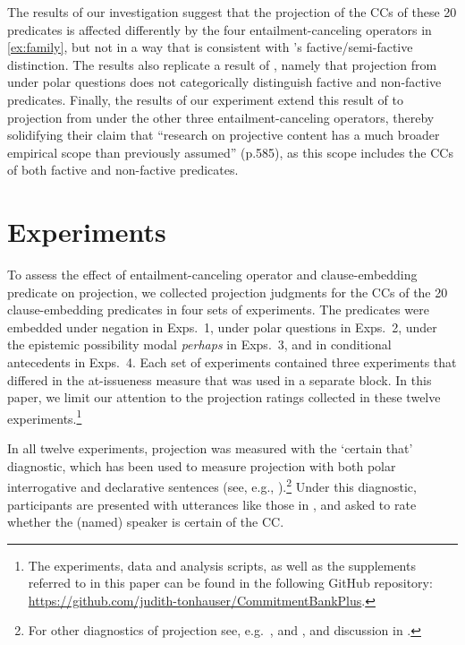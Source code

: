 \documentclass[a4paper,12pt,twoside]{article}
\newcommand{\poscite}[1]{\citeauthor{#1}'s \citeyear{#1}}
\begin{document}
    The results of our investigation suggest that the projection of the CCs of these 20 predicates is affected differently by the four entailment-canceling operators in \ref{ex:family},  but not in a way that is consistent with \poscite{karttunen_observations_1971} factive/semi-factive distinction. The results also replicate a result of \citealt{degen_are_2022}, namely that projection from under polar questions does not categorically distinguish factive and non-factive predicates. Finally, the results of our experiment extend this result of \citealt{degen_are_2022} to projection from under the other three entailment-canceling operators, thereby solidifying their claim that ``research on projective content has a much broader empirical scope than previously assumed'' (p.585), as this scope includes the CCs of both factive and non-factive predicates.


\section{Experiments}\label{s2}
	To assess the effect of entailment-canceling operator and clause-embedding predicate on projection, we collected projection judgments for the CCs of the 20 clause-embedding predicates in four sets of experiments.
    The predicates were embedded under negation in Exps.~1, under polar questions in Exps.~2, under the epistemic possibility modal {\em perhaps} in Exps.~3, and in conditional antecedents in Exps.~4. Each set of experiments contained three experiments that differed in the at-issueness measure that was used in a separate block. In this paper, we limit our attention to the projection ratings collected in these twelve experiments.\footnote{\label{footnote-supplement}The experiments, data and analysis scripts, as well as the supplements referred to in this paper can be found in the following GitHub repository: \url{https://github.com/judith-tonhauser/CommitmentBankPlus}.}

	In all twelve experiments, projection was measured with the `certain that' diagnostic, which has been used to measure projection with both polar interrogative and declarative sentences (see, e.g., \citealt{tonhauser_prosodic_2016,djarv_prosodic_2017,stevens_rational_2017,tonhauser_how_2018,mahler_does_2019,mahler_social_2020,de_marneffe_commitmentbank_2019,sieker_projective_2022}).\footnote{For other diagnostics of projection see, e.g.\ \citealt{smith_projection_2011,xue_correlation_2011}, and \citealt{tonhauser_toward_2013}, and discussion in \citealt{tonhauser_how_2018}.}
    Under this diagnostic, participants are presented with utterances like those in \Next, and asked to rate whether the (named) speaker is certain of the CC. 
\end{document}
